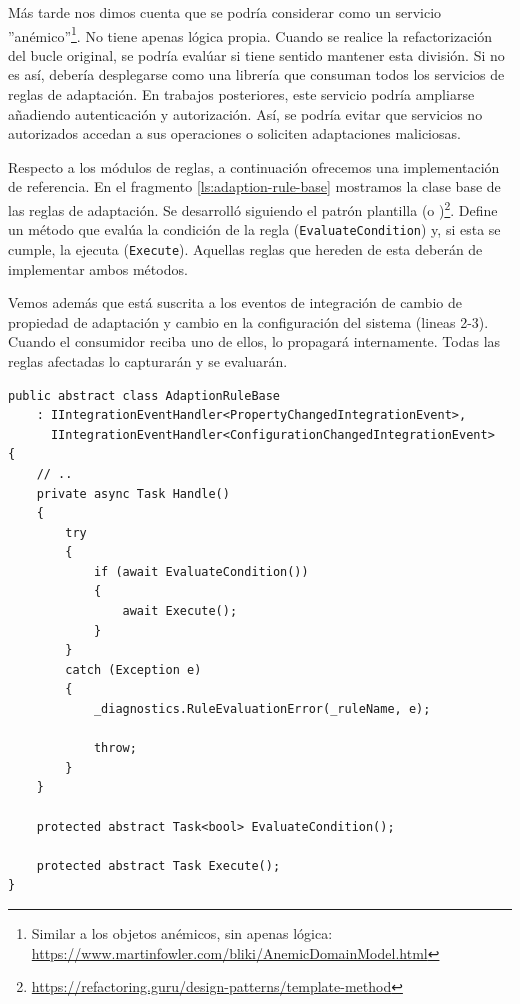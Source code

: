 Más tarde nos dimos cuenta que se podría considerar como un servicio ''anémico''\footnote{Similar a los objetos anémicos, sin apenas lógica: \url{https://www.martinfowler.com/bliki/AnemicDomainModel.html}}. \cite{singjaiPatternsDerivingAPIs2021} No tiene apenas lógica propia. Cuando se realice la refactorización del bucle original, se podría evalúar si tiene sentido mantener esta división. Si no es así, debería desplegarse como una librería que consuman todos los servicios de reglas de adaptación. En trabajos posteriores, este servicio podría ampliarse añadiendo autenticación y autorización. Así, se podría evitar que servicios no autorizados accedan a sus operaciones o soliciten adaptaciones maliciosas.

Respecto a los módulos de reglas, a continuación ofrecemos una implementación de referencia. En el fragmento \ref{ls:adaption-rule-base} mostramos la clase base de las reglas de adaptación. Se desarrolló siguiendo el patrón plantilla (o )\footnote{\url{https://refactoring.guru/design-patterns/template-method}}. Define un método que evalúa la condición de la regla (\texttt{EvaluateCondition}) y, si esta se cumple, la ejecuta (\texttt{Execute}). Aquellas reglas que hereden de esta deberán de implementar ambos métodos.

Vemos además que está suscrita a los eventos de integración de cambio de propiedad de adaptación y cambio en la configuración del sistema (lineas 2-3). Cuando el consumidor reciba uno de ellos, lo propagará internamente. Todas las reglas afectadas lo capturarán y se evaluarán.

\begin{lstlisting}[caption={Clase base para implementar reglas de adaptación. Se evalúa la condición, y si esta se cumple, se ejecuta. \protect\footnotemark},captionpos=b, label=ls:adaption-rule-base]
public abstract class AdaptionRuleBase
    : IIntegrationEventHandler<PropertyChangedIntegrationEvent>,
      IIntegrationEventHandler<ConfigurationChangedIntegrationEvent>
{
    // ..
    private async Task Handle()
    {
        try
        {
            if (await EvaluateCondition())
            {
                await Execute();
            }
        }
        catch (Exception e)
        {
            _diagnostics.RuleEvaluationError(_ruleName, e);

            throw;
        }
    }

    protected abstract Task<bool> EvaluateCondition();

    protected abstract Task Execute();
}
\end{lstlisting}

